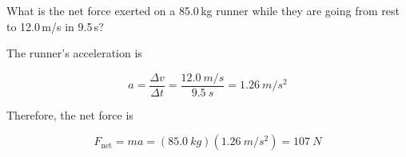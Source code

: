 \documentclass[answers]{exam}
\begin{document}
\begin{questions}
\question
What is the net force exerted on a 85.0\,kg runner while they are going from rest to 12.0\,m/s in 9.5\,s?

\begin{solutionorbox}[6cm]
The runner's acceleration is

\begin{equation*}
    a = \frac{\Delta v}{\Delta t} = \frac{\SI{12.0}{m/s}}{\SI{9.5}{s}} = \SI{1.26}{m/s^2}
\end{equation*}

Therefore, the net force is

\begin{equation*}
    F_\mathrm{net} = ma = (\SI{85.0}{kg})(\SI{1.26}{m/s^2}) = \boxed{\SI{107}{N}}
\end{equation*}
\end{solutionorbox}

\end{questions}
\end{document}
